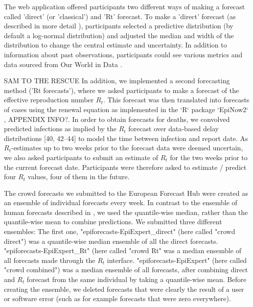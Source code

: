 \documentclass[10pt,a4paper,twocolumn]{article}
\begin{document}
The web application offered participants two different ways of making a forecast called 'direct' (or 'classical') and 'Rt' forecast. To make a 'direct' forecast (as described in more detail \cite{bosseComparingHumanModelbased2022}), participants selected a predictive distribution (by default a log-normal distribution) and adjusted the median and width of the distribution to change the central estimate and uncertainty. In addition to information about past observations, participants could see various metrics and data sourced from Our World in Data \citep{owidcoronavirus}. 

SAM TO THE RESCUE
In addition, we implemented a second forecasting method ('Rt forecasts'), where we asked participants to make a forecast of the effective reproduction number $R_t$. This forecast was then translated into forecasts of cases using the renewal equation \citep{fraserEstimatingIndividualHousehold2007} as implemented in the `R` package `EpiNow2` \citep{epinow2}, APPENDIX INFO?. In order to obtain forecasts for deaths, we convolved predicted infections as implied by the $R_t$ forecast over data-based delay distributions [40, 42–44] to model the time between infection and report date. As $R_t$-estimates up to two weeks prior to the forecast data were deemed uncertain, we also asked participants to submit an estimate of $R_t$ for the two weeks prior to the current forecast date. Participants were therefore asked to estimate / predict four $R_t$ values, four of them in the future. 

The crowd forecasts we submitted to the European Forecast Hub were created as an ensemble of individual forecasts every week. In contrast to the ensemble of human forecasts described in \cite{bosseComparingHumanModelbased2022}, we used the quantile-wise median, rather than the quantile-wise mean to combine predictions. %
We submitted three different ensembles: The first one, "epiforecasts-EpiExpert\_direct" (here called "crowd direct") was a quantile-wise median ensemble of all the direct forecasts. "epiforecasts-EpiExpert\_Rt" (here called "crowd Rt" was a median ensemble of all forecasts made through the $R_t$ interface. "epiforecasts-EpiExpert" (here called "crowd combined") was a median ensemble of all forecasts, after combining direct and $R_t$ forecast from the same individual by taking a quantile-wise mean. Before creating the ensemble, we deleted forecasts that were clearly the result of a user or software error (such as for example forecasts that were zero everywhere).
\end{document}
